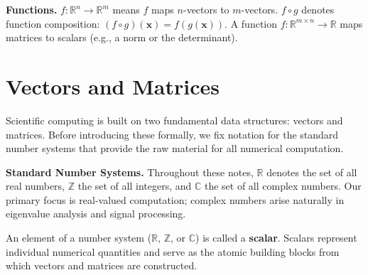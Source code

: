 \documentclass[
  letterpaper,
]{scrbook}
\newcommand{\fR}{\mathbb{R}}
\newcommand{\bx}{\boldsymbol{x}}
\begin{document}
\begin{tcolorbox}[enhanced jigsaw, arc=.35mm, bottomrule=.15mm, bottomtitle=1mm, breakable, colback=white, colbacktitle=quarto-callout-tip-color!10!white, colframe=quarto-callout-tip-color-frame, coltitle=black, left=2mm, leftrule=.75mm, opacityback=0, opacitybacktitle=0.6, rightrule=.15mm, title={Tip}, titlerule=0mm, toprule=.15mm, toptitle=1mm]

\textbf{Functions.} \(f : \fR^n \to \fR^m\) means \(f\) maps
\(n\)-vectors to \(m\)-vectors. \(f \circ g\) denotes function
composition: \((f \circ g)(\bx) = f(g(\bx))\). A function
\(f : \fR^{m \times n} \to \fR\) maps matrices to scalars (e.g., a norm
or the determinant).

\end{tcolorbox}

\chapter{Vectors and Matrices}\label{vectors-and-matrices}

Scientific computing is built on two fundamental data structures:
vectors and matrices. Before introducing these formally, we fix notation
for the standard number systems that provide the raw material for all
numerical computation.

\textbf{Standard Number Systems.} Throughout these notes, \(\mathbb{R}\)
denotes the set of all real numbers, \(\mathbb{Z}\) the set of all
integers, and \(\mathbb{C}\) the set of all complex numbers. Our primary
focus is real-valued computation; complex numbers arise naturally in
eigenvalue analysis and signal processing.

\begin{tcolorbox}[enhanced jigsaw, arc=.35mm, bottomrule=.15mm, bottomtitle=1mm, breakable, colback=white, colbacktitle=quarto-callout-note-color!10!white, colframe=quarto-callout-note-color-frame, coltitle=black, left=2mm, leftrule=.75mm, opacityback=0, opacitybacktitle=0.6, rightrule=.15mm, title={Definition: Scalar}, titlerule=0mm, toprule=.15mm, toptitle=1mm]

An element of a number system (\(\mathbb{R}\), \(\mathbb{Z}\), or
\(\mathbb{C}\)) is called a \textbf{scalar}. Scalars represent
individual numerical quantities and serve as the atomic building blocks
from which vectors and matrices are constructed.

\end{tcolorbox}
\end{document}
